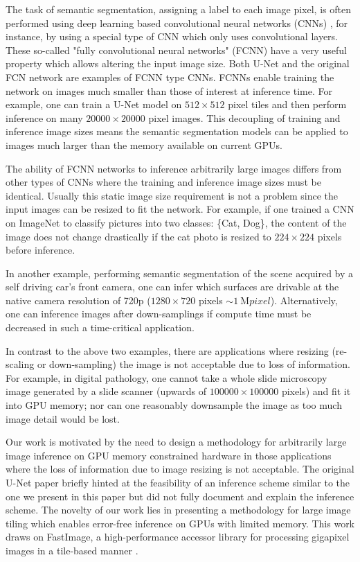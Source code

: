 \documentclass[runningheads]{llncs}
\begin{document}
The task of semantic segmentation, assigning a label to each image pixel, is often performed using deep learning based convolutional neural networks (CNNs) \cite{Badrinarayanan2015a,Ronneberger2015a}, for instance, by using a special type of CNN which only uses convolutional layers.
These so-called "fully convolutional neural networks" (FCNN) have a very useful property which allows altering the input image size. 
Both U-Net \cite{Ronneberger2015a} and the original FCN network \cite{Long2015} are examples of FCNN type CNNs. 
FCNNs enable training the network on images much smaller than those of interest at inference time. 
For example, one can train a U-Net model on $512 \times 512$ pixel tiles and then perform inference on many $\num{20000} \times \num{20000}$ pixel images. This decoupling of training and inference image sizes means the semantic segmentation models can be applied to images much larger than the memory available on current GPUs. 

The ability of FCNN networks to inference arbitrarily large images differs from other types of CNNs where the training and inference image sizes must be identical. Usually this static image size requirement is not a problem since the input images can be resized to fit the network. For example, if one trained a CNN on ImageNet \cite{Russakovsky2015} to classify pictures into two classes: \{Cat, Dog\}, the content of the image does not change drastically if the cat photo is resized to $224 \times 224$ pixels before inference.

In another example, performing semantic segmentation of the scene acquired by a self driving car's front camera, one can infer which surfaces are drivable at the native camera resolution of 720p ($1280 \times 720$ pixels $\sim \SI{1}{\mega pixel}$). Alternatively, one can inference images after down-samplings if compute time must be decreased in such a time-critical application. 

In contrast to the above two examples, there are applications where resizing (re-scaling or down-sampling) the image is not acceptable due to loss of information. For example, in digital pathology, one cannot take a whole slide microscopy image generated by a slide scanner (upwards of $\num{100000} \times \num{100000}$ pixels) and fit it into GPU memory; nor can one reasonably downsample the image as too much image detail would be lost. 

Our work is motivated by the need to design a methodology for arbitrarily large image inference on GPU memory constrained hardware in those applications where the loss of information due to image resizing is not acceptable. The original U-Net paper \cite{Ronneberger2015a} briefly hinted at the feasibility of an inference scheme similar to the one we present in this paper but did not fully document and explain the inference scheme. 
The novelty of our work lies in presenting a methodology for large image tiling which enables error-free inference on GPUs with limited memory. This work draws on FastImage, a high-performance accessor library for processing gigapixel images in a tile-based manner \cite{Bardakoff2019}.
\end{document}
